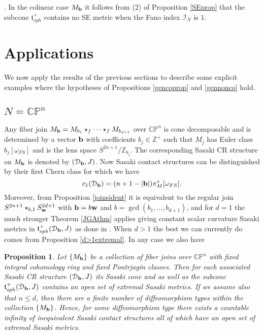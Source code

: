 \documentclass[12pt]{amsart}
\newtheorem{proposition}[theorem]{Proposition}
\newenvironment{remark}{\medskip \refstepcounter{theorem}
\noindent  {\bf Remark \thetheorem}.\rm}{\,}
\renewcommand{\thetheorem}{\thesection.\arabic{theorem}}
\def\bbc{{\mathbb C}}
\def\bbp{{\mathbb P}}
\def\bbz{{\mathbb Z}}
\def\gro{\omega}
\def\bfb{{\bf b}}
\def\bfw{{\bf w}}
\def\cald{{\mathcal D}}
\def\cali{{\mathcal I}}
\def\gt{{\mathfrak t}}
\begin{document}
\begin{remark}\label{ind1rem}
In the colinear case $M_\bfb$ it follows from (2) of Proposition \ref{SEprop} that the subcone $\gt^+_{sph}$ contains no SE metric when the Fano index $\cali_N$ is $1$.
\end{remark}


\section{Applications}
We now apply the results of the previous sections to describe some explicit examples where the hypotheses of Propositions \ref{gencoprop} and \ref{gennonco} hold.

\subsection{$N=\bbc\bbp^n$}
Any fiber join $M_\bfb=M_{b_1}\star_f\cdots \star_f M_{b_{d+1}}$ over $\bbc\bbp^n$ is cone decomposable and is determined by a vector $\bfb$ with coefficients $b_j\in \bbz^+$ such that $M_j$ has Euler class $b_j[\gro_{FS}]$ and is the lens space $S^{2n+1}/\bbz_{b_j}$. The corresponding Sasaki CR structure on $M_\bfb$ is denoted by $(\cald_\bfb,J)$. Now Sasaki contact structures can be distinguished by their first Chern class for which we have
\begin{equation}\label{c1cpn}
c_1(\cald_\bfb)=(n+1-|\bfb|)\pi^*_M[\gro_{FS}].
\end{equation}
Moreover, from Proposition \ref{joinsident} it is equivalent to the regular join $S^{2n+1}\star_{b,1}S^{2d+1}_\bfw$ with $\bfb=b\bfw$ and $b=\gcd(b_1,\ldots,b_{d+1})$, and for $d=1$ the much stronger Theorem \ref{JGAthm} applies giving constant scalar curvature Sasaki metrics in $\gt^+_{sph}(\cald_\bfb,J)$ as done in \cite{BoTo14a}. When $d>1$ the best we can currently do comes from Proposition \ref{d>1extremal}. In any case we also have

\begin{proposition}\label{cpnprop}
Let $\{M_\bfb\}$ be a collection of fiber joins over $\bbc\bbp^n$ with fixed integral cohomology ring and fixed Pontrjagin classes. Then for each associated Sasaki CR structure $(\cald_\bfb,J)$ its Sasaki cone and as well as the subcone $\gt^+_{sph}(\cald_\bfb,J)$ contains an open set of extremal Sasaki metrics. If we assume also that $n\leq d$, then there are a finite number of diffeomorphism types within the collection $\{M_\bfb\}$. Hence, for some diffeomorphism type there exists a countable infinity of inequivalent Sasaki contact structures all of which have an open set of extremal Sasaki metrics.
\end{proposition}
\end{document}
